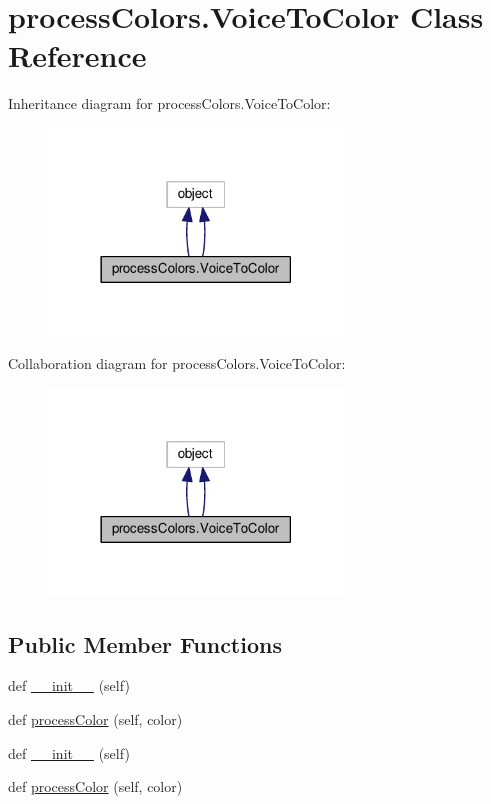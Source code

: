 \hypertarget{classprocessColors_1_1VoiceToColor}{}\section{process\+Colors.\+Voice\+To\+Color Class Reference}
\label{classprocessColors_1_1VoiceToColor}


Inheritance diagram for process\+Colors.\+Voice\+To\+Color\+:
\nopagebreak
\begin{figure}[H]
\begin{center}
\leavevmode
\includegraphics[width=222pt]{classprocessColors_1_1VoiceToColor__inherit__graph}
\end{center}
\end{figure}


Collaboration diagram for process\+Colors.\+Voice\+To\+Color\+:
\nopagebreak
\begin{figure}[H]
\begin{center}
\leavevmode
\includegraphics[width=222pt]{classprocessColors_1_1VoiceToColor__coll__graph}
\end{center}
\end{figure}
\subsection*{Public Member Functions}
\begin{DoxyCompactItemize}
\item 
def \hyperlink{classprocessColors_1_1VoiceToColor_abe7cd55778b568c1902f04d1fb6f83f1}{\+\_\+\+\_\+init\+\_\+\+\_\+} (self)
\item 
def \hyperlink{classprocessColors_1_1VoiceToColor_a76d0439d776fc090dd47bdfad6dbabd7}{process\+Color} (self, color)
\item 
def \hyperlink{classprocessColors_1_1VoiceToColor_abe7cd55778b568c1902f04d1fb6f83f1}{\+\_\+\+\_\+init\+\_\+\+\_\+} (self)
\item 
def \hyperlink{classprocessColors_1_1VoiceToColor_a76d0439d776fc090dd47bdfad6dbabd7}{process\+Color} (self, color)
\end{DoxyCompactItemize}
